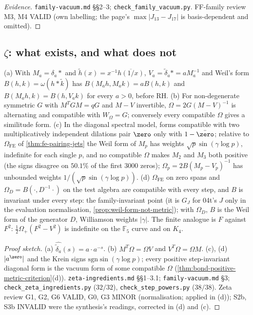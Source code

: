 \begin{proof}[Evidence] \texttt{family-vacuum.md} \S\S2--3; \texttt{check\_family\_vacuum.py}. FF-family review M3, M4 VALID (own labelling; the page's $\max|J_{13}-J_{17}|$ is
basis-dependent and omitted).
\end{proof}

\subsection{$\zeta$: what exists, and what does not}

\begin{proposition}
\label{prop:gkp-zeta-prime-steps} 
(a) With $M_a = \delta_a*$ and $\tilde h(x) = x^{-1}\overline{h(1/x)}$, $V_a = \tilde\delta_a* = aM_a^{-1}$ and Weil's form $B(h,k) = \omega(h*\tilde k)$ has $B(M_ah,M_ak) =
aB(h,k)$ and $B(M_ah,k) = B(h,V_ak)$ for every $a>0$, before RH. (b) For non-degenerate symmetric $G$ with $M^TGM = qG$ and $M-V$ invertible, $\Omega = 2G(M-V)^{-1}$ is %
alternating and compatible with $W_\Omega = G$; conversely every compatible $\Omega$ gives a similitude form. (c) In the diagonal spectral model, forms compatible with two %
multiplicatively independent dilations pair $\zero$ only with $1-\bar\zero$; relative to $\Omega_{\mathrm{FE}}$ of \cref{thm:fe-pairing-jets} the Weil form of $M_p$ has weights %
$\sqrt p\sin(\gamma\log p)$, indefinite for each single $p$, and no compatible $\Omega$ makes $M_2$ and $M_3$ both positive (the signs disagree on $50.1\%$ of the first $3000$ %
zeros); $\Omega_p = 2B(M_p-V_p)^{-1}$ has unbounded weights $1/(\sqrt p\sin(\gamma\log p))$. (d) $\Omega_{\mathrm{FE}}$ on zero spans and $\Omega_D = B(\cdot,D^{-1}\cdot)$ on the %
test algebra are compatible with every step, and $B$ is invariant under every step: the family-invariant point (it is $G_J$ for 04t's $J$ only in the evaluation normalisation,
\cref{prop:weil-form-not-metric}); with $\Omega_D$, $B$ is the Weil form of the generator $D$, Williamson weights $|\gamma|$. The finite analogue is $F$ against $F^2$: %
$\tfrac12\Omega_+(F^2-V^2)$ is indefinite on the $\mathbb F_5$ curve and on $K_4$. %
\end{proposition}
\begin{proof}[Proof sketch] (a) $\widehat{\tilde\delta_a}(s) = a\cdot a^{-s}$. (b) $M^T\Omega = \Omega V$ and $V^T\Omega = \Omega M$. (c), (d) $|a^{\zero}|$ and the Krein signs %
$\mathrm{sgn}\sin(\gamma\log p)$; every positive step-invariant diagonal form is the vacuum form of some compatible $\Omega$ (\cref{thm:bond-positive-metric-criterion}(d)). %
\texttt{zeta-ingredients.md} \S\S1--3.1; \texttt{family-vacuum.md} \S3; \texttt{check\_zeta\_ingredients.py} ($32/32$), \texttt{check\_step\_powers.py} ($38/38$). Zeta review G1,
G2, G6 VALID, G0, G3 MINOR (normalisation; applied in (d)); S2b, S3b INVALID were the synthesis's readings, corrected in (d) and (c).
\end{proof}
